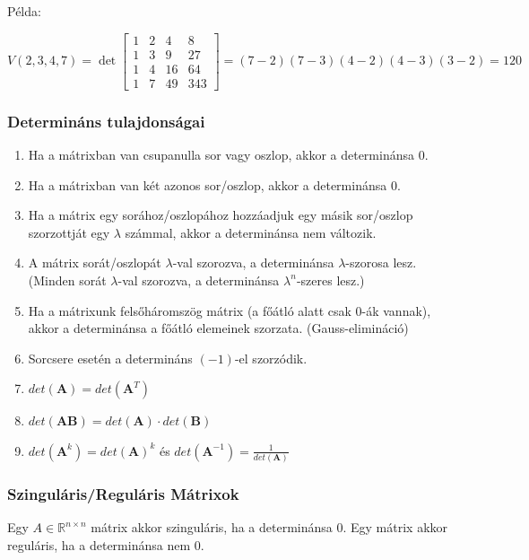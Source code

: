 \documentclass{article}
\begin{document}
Példa: 

\begin{equation*}
    V(2, 3, 4, 7) = \det \begin{bmatrix} 1 & 2 & 4 & 8 \\ 1 & 3 & 9 & 27 \\ 1 & 4 & 16 & 64 \\ 1 & 7 & 49 & 343 \end{bmatrix} = (7-2)(7-3)(4-2)(4-3)(3-2) = 120
\end{equation*}

\subsubsection{Determináns tulajdonságai}

\begin{enumerate}
    \item Ha a mátrixban van csupanulla sor vagy oszlop, akkor a determinánsa 0.
    \item Ha a mátrixban van két azonos sor/oszlop, akkor a determinánsa 0.
    \item Ha a mátrix egy sorához/oszlopához hozzáadjuk egy másik sor/oszlop szorzottját egy $\lambda$ számmal, akkor a determinánsa nem változik.
    \item A mátrix sorát/oszlopát $\lambda$-val szorozva, a determinánsa $\lambda$-szorosa lesz. (Minden sorát $\lambda$-val szorozva, a determinánsa $\lambda^n$-szeres lesz.)
    \item Ha a mátrixunk felsőháromszög mátrix (a főátló alatt csak 0-ák vannak), akkor a determinánsa a főátló elemeinek szorzata. (Gauss-elimináció)
    \item Sorcsere esetén a determináns $(-1)$-el szorzódik.
    \item $det(\mathbf{A}) = det(\mathbf{A}^T)$
    \item $det(\mathbf{AB}) = det(\mathbf{A}) \cdot det(\mathbf{B})$
    \item $det(\mathbf{A}^k) = det(\mathbf{A})^k$ \quad és \quad $det(\mathbf{A}^{-1}) = \frac{1}{det(\mathbf{A})}$
\end{enumerate}

\newpage

\subsubsection{Szinguláris/Reguláris Mátrixok}

Egy $A \in \mathbb{R}^{n \times n}$ mátrix akkor szinguláris, ha a determinánsa 0. Egy mátrix akkor reguláris, ha a determinánsa nem 0.
\end{document}
